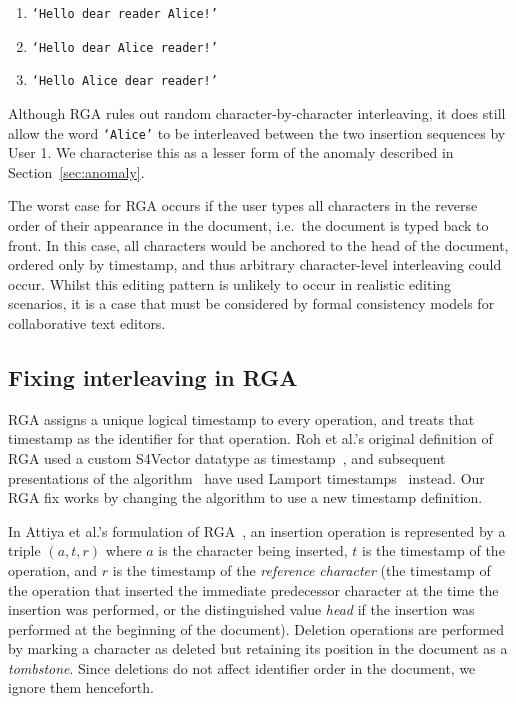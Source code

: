 \documentclass[sigconf]{acmart}
\begin{document}
\begin{enumerate}
\item \texttt{`Hello dear reader Alice!'}
\item \texttt{`Hello dear Alice reader!'}
\item \texttt{`Hello Alice dear reader!'}
\end{enumerate}

Although RGA rules out random character-by-character interleaving, it does still allow the word \texttt{`Alice'} to be interleaved between the two insertion sequences by User 1.
We characterise this as a lesser form of the anomaly described in Section~\ref{sec:anomaly}.

The worst case for RGA occurs if the user types all characters in the reverse order of their appearance in the document, i.e.\ the document is typed back to front.
In this case, all characters would be anchored to the head of the document, ordered only by timestamp, and thus arbitrary character-level interleaving could occur.
Whilst this editing pattern is unlikely to occur in realistic editing scenarios, it is a case that must be considered by formal consistency models for collaborative text editors.

\subsection{Fixing interleaving in RGA}\label{sec:fixing-rga}

RGA assigns a unique logical timestamp to every operation, and treats that timestamp as the identifier for that operation.
Roh et al.'s original definition of RGA used a custom S4Vector datatype as timestamp~\cite{Roh:2011dw}, and subsequent presentations of the algorithm~\cite{Shapiro:2011wy} have used Lamport timestamps~\cite{Lamport:1978jq} instead.
Our RGA fix works by changing the algorithm to use a new timestamp definition.

In Attiya et al.'s formulation of RGA~\cite{Attiya:2016kh}, an insertion operation is represented by a triple $(a, t, r)$ where $a$ is the character being inserted, $t$ is the timestamp of the operation, and $r$ is the timestamp of the \emph{reference character} (the timestamp of the operation that inserted the immediate predecessor character at the time the insertion was performed, or the distinguished value \textit{head} if the insertion was performed at the beginning of the document).
Deletion operations are performed by marking a character as deleted but retaining its position in the document as a \emph{tombstone}.
Since deletions do not affect identifier order in the document, we ignore them henceforth.
\end{document}
